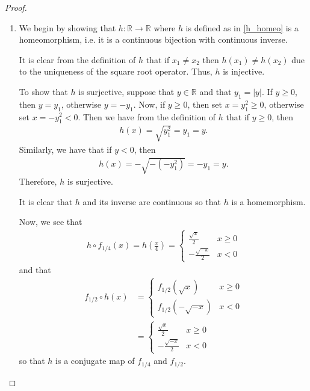 \begin{proof}
  \begin{enumerate}
    \item We begin by showing that $h: \mathbb{R}\to\mathbb{R}$ where $h$ is defined as in \eqref{h_homeo}
      is a homeomorphism, i.e. it is a continuous bijection with continuous inverse.

      It is clear from the definition of $h$ that if $x_1 \neq x_2$ then $h(x_1) \neq h(x_2)$ due to the
      uniqueness of the square root operator. Thus, $h$ is injective.

      To show that $h$ is surjective, suppose that $y\in\mathbb{R}$ and that $y_1 = |y|$.
      If $y \geq 0$, then $y = y_1$, otherwise $y = -y_1$.
      Now, if $y \geq 0$, then set $x = y_1^2 \geq 0$, otherwise set $x = -y_1^2 < 0$.
      Then we have from the definition of $h$
      that if $y\geq 0$, then
      \begin{align*}
        h(x) = \sqrt{y_1^2} = y_1 = y.
      \end{align*}
      Similarly, we have that if $y < 0$, then
      \begin{align*}
        h(x) = -\sqrt{-\left(-y_1^2\right)} = -y_1 = y.
      \end{align*}
      Therefore, $h$ is surjective.

      It is clear that $h$ and its inverse are continuous so that $h$ is a homemorphism.

      Now, we see that
      \begin{align*}
        h \circ f_{1/4}(x) = h\left(\frac{x}{4}\right) =
        \begin{cases}
          \frac{\sqrt{x}}{2} & x \geq 0 \\
          -\frac{\sqrt{-x}}{2}& x < 0
        \end{cases}
      \end{align*}
      and that
      \begin{align*}
        f_{1/2} \circ h(x) &=
        \begin{cases}
          f_{1/2}\left(\sqrt{x}\right) & x \geq 0 \\
          f_{1/2}\left(-\sqrt{-x}\right) & x < 0
        \end{cases}\\
        &=
        \begin{cases}
          \frac{\sqrt{x}}{2} & x \geq 0 \\
          -\frac{\sqrt{-x}}{2}& x < 0
        \end{cases}
      \end{align*}
      so that $h$ is a conjugate map of $f_{1/4}$ and $f_{1/2}$.


\end{enumerate}
\end{proof}
